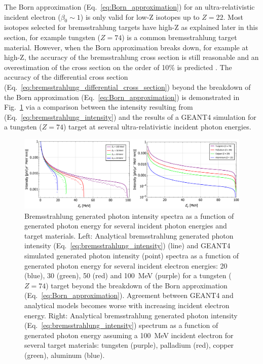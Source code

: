 \documentclass[../main.tex]{subfiles}
\begin{document}
The Born approximation (Eq.~\ref{eq:Born_approximation}) for an ultra-relativistic incident electron ($\beta_{0}\sim 1$) is only valid for low-Z isotopes up to $Z = 22$. Most isotopes selected for bremsstrahlung targets have high-Z as explained later in this section, for example tungsten ($Z = 74$) is a common bremsstrahlung target material. However, when the Born approximation breaks down, for example at high-Z, the accuracy of the bremsstrahlung cross section is still reasonable \cite{koch1959bremsstrahlung} and an overestimation of the cross section on the order of 10\% is predicted \cite{olsen1957theory}. The accuracy of the differential cross section (Eq.~\ref{eq:bremsstrahlung_differential_cross_section}) beyond the breakdown of the Born approximation (Eq.~\ref{eq:Born_approximation}) is demonstrated in Fig.~\ref{fig:BremIntensityEZ} via a comparison between the intensity resulting from (Eq.~\ref{eq:bremsstrahlung_intensity}) and the results of a \textsc{GEANT4} \cite{agostinelli2003geant4} simulation for a tungsten ($Z = 74$) target at several ultra-relativistic incident photon energies. 
\begin{figure}[!h]
\centering
\includegraphics[width=\textwidth]{Figures/DIANA_Inverse_Compton_Source_Design/BremIntensityEZ.pdf}
\caption{Bremsstrahlung generated photon intensity spectra as a function of generated photon energy for several incident photon energies and target materials. Left: Analytical bremsstrahlung generated photon intensity (Eq.~\ref{eq:bremsstrahlung_intensity}) (line) and \textsc{GEANT4} simulated generated photon intensity (point) spectra as a function of generated photon energy for several incident electron energies: 20 (blue), 30 (green), 50 (red) and 100~\si{\mega\electronvolt} (purple) for a tungsten ($Z = 74$) target beyond the breakdown of the Born approximation (Eq.~\ref{eq:Born_approximation}). Agreement between \textsc{GEANT4} and analytical models becomes worse with increasing incident electron energy. Right: Analytical bremsstrahlung generated photon intensity (Eq.~\ref{eq:bremsstrahlung_intensity}) spectrum as a function of generated photon energy assuming a 100~\si{\mega\electronvolt} incident electron for several target materials: tungsten (purple), palladium (red), copper (green), aluminum (blue).}
\label{fig:BremIntensityEZ}
\end{figure}
\end{document}
